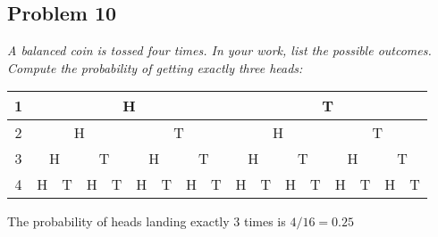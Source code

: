 \documentclass[a4paper,man,natbib]{apa6}
\begin{document}
\subsection{Problem 10}
\emph{A balanced coin is tossed four times. In your work, list the possible outcomes. Compute the probability of getting exactly three heads:} \vspace{1em}

\begin{tabular}{|c|cccccccc|cccccccc|}
	\hline
	1 &
	\multicolumn{8}{c|}{H} &
	\multicolumn{8}{c|}{T} \\ \hline
	2 &
	\multicolumn{4}{c|}{H} &
	\multicolumn{4}{c|}{T} &
	\multicolumn{4}{c|}{H} &
	\multicolumn{4}{c|}{T} \\ \hline
	3 &
	\multicolumn{2}{c|}{H} &
	\multicolumn{2}{c|}{T} &
	\multicolumn{2}{c|}{H} &
	\multicolumn{2}{c|}{T} &
	\multicolumn{2}{c|}{H} &
	\multicolumn{2}{c|}{T} &
	\multicolumn{2}{c|}{H} &
	\multicolumn{2}{c|}{T} \\ \hline
	4 &
	\multicolumn{1}{c|}{H} &
	\multicolumn{1}{c|}{\cellcolor[HTML]{34FF34}T} &
	\multicolumn{1}{c|}{\cellcolor[HTML]{34FF34}H} &
	\multicolumn{1}{c|}{T} &
	\multicolumn{1}{c|}{\cellcolor[HTML]{34FF34}H} &
	\multicolumn{1}{c|}{T} &
	\multicolumn{1}{c|}{H} &
	T &
	\multicolumn{1}{c|}{\cellcolor[HTML]{34FF34}H} &
	\multicolumn{1}{c|}{T} &
	\multicolumn{1}{c|}{H} &
	\multicolumn{1}{c|}{T} &
	\multicolumn{1}{c|}{H} &
	\multicolumn{1}{c|}{T} &
	\multicolumn{1}{c|}{H} &
	T \\ \hline
\end{tabular}

\vspace{1em}
The probability of heads landing exactly 3 times is $4/16 = 0.25$


\end{document}
